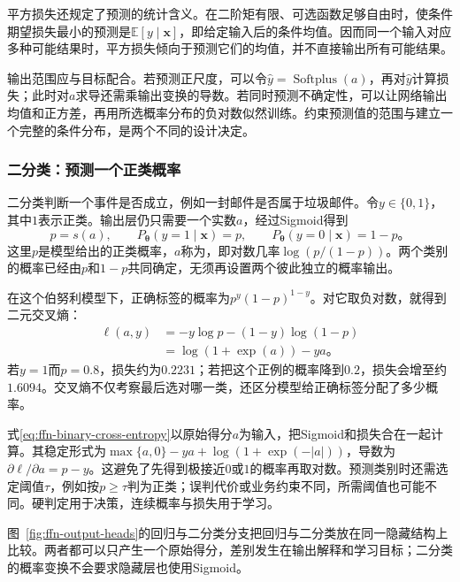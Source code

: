 平方损失还规定了预测的统计含义。在二阶矩有限、可选函数足够自由时，使条件期望损失最小的预测是$\mathbb{E}[y\mid\bm{x}]$，即给定输入后的条件均值。因而同一个输入对应多种可能结果时，平方损失倾向于预测它们的均值，并不直接输出所有可能结果。

输出范围应与目标配合。若预测正尺度，可以令$\widehat y=\operatorname{Softplus}(a)$，再对$\widehat y$计算损失；此时对$a$求导还需乘输出变换的导数。若同时预测不确定性，可以让网络输出均值和正方差，再用所选概率分布的负对数似然训练。约束预测值的范围与建立一个完整的条件分布，是两个不同的设计决定。

\subsubsection{二分类：预测一个正类概率}
\label{sec:ffn-output-binary}

二分类判断一个事件是否成立，例如一封邮件是否属于垃圾邮件。令$y\in\{0,1\}$，其中$1$表示正类。输出层仍只需要一个实数$a$，经过Sigmoid得到
\[
  p=s(a),\qquad P_{\bm{\theta}}(y=1\mid\bm{x})=p,
  \qquad P_{\bm{\theta}}(y=0\mid\bm{x})=1-p\text{。}
\]
这里$p$是模型给出的正类概率，$a$称为，即对数几率$\log(p/(1-p))$。两个类别的概率已经由$p$和$1-p$共同确定，无须再设置两个彼此独立的概率输出。

在这个伯努利模型下，正确标签的概率为$p^y(1-p)^{1-y}$。对它取负对数，就得到二元交叉熵：
\begin{equation}
  \begin{aligned}
    \ell(a,y)
      &=-y\log p-(1-y)\log(1-p)\\
      &=\log(1+\exp(a))-ya\text{。}
  \end{aligned}
  \label{eq:ffn-binary-cross-entropy}
\end{equation}
若$y=1$而$p=0.8$，损失约为$0.2231$；若把这个正例的概率降到$0.2$，损失会增至约$1.6094$。交叉熵不仅考察最后选对哪一类，还区分模型给正确标签分配了多少概率。

式\eqref{eq:ffn-binary-cross-entropy}以原始得分$a$为输入，把Sigmoid和损失合在一起计算。其稳定形式为$\max\{a,0\}-ya+\log(1+\exp(-|a|))$，导数为$\partial\ell/\partial a=p-y$。这避免了先得到极接近$0$或$1$的概率再取对数。预测类别时还需选定阈值$\tau$，例如按$p\geq\tau$判为正类；误判代价或业务约束不同，所需阈值也可能不同。硬判定用于决策，连续概率与损失用于学习。

图~\ref{fig:ffn-output-heads}的回归与二分类分支把回归与二分类放在同一隐藏结构上比较。两者都可以只产生一个原始得分，差别发生在输出解释和学习目标；二分类的概率变换不会要求隐藏层也使用Sigmoid。



